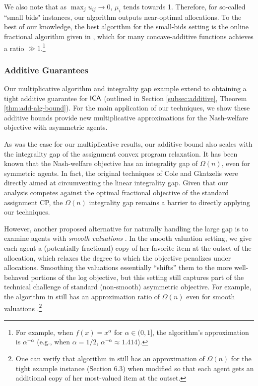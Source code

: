 We also note that as $\max_{j}u_{ij} \rightarrow 0$, $\mu_i$ tends towards 1. Therefore, for so-called ``small bids" instances, our algorithm outputs near-optimal allocations. To the best of our knowledge, the best algorithm for the small-bids setting is  the online fractional algorithm given in \cite{devanur2012online}, which
for many concave-additive functions achieves a ratio $\gg 1$.\footnote{For example, when $f(x) = x^\alpha$ for $\alpha \in (0,1]$, the algorithm's approximation is $\alpha^{-\alpha}$ (e.g., when $\alpha = 1/2$, $ \alpha^{-\alpha} \approx 1.414$).}


\subsubsection{Additive Guarantees}
\label{subsub:add-guar}


Our multiplicative algorithm and integrality gap example extend to obtaining a tight additive guarantee for $\mathsf{ICA}$ (outlined in Section 
\ref{subsec:additive}, Theorem \ref{thm:add-alg-bound}).
For the main application of our techniques, we show these additive bounds provide new multiplicative approximations for the Nash-welfare objective with asymmetric agents.

As was the case for our multiplicative results,  our additive bound also scales with the integrality gap of the assignment convex program relaxation. 
It has been known that the Nash-welfare objective has an integrality gap of $\Omega(n)$, even for symmetric agents. In fact, the original techniques of Cole and Gkatzelis \cite{cole2015approximating} were directly aimed at circumventing the linear integrality gap. Given that our analysis competes against the optimal fractional objective of the standard assignment CP, the $\Omega(n)$ integrality gap remains a barrier to directly applying our techniques. 


However, another proposed alternative for naturally handling the large gap is to examine agents with {\em smooth valuations} \cite{fain2018fair, fluschnik2019fair}.
In the smooth valuation setting, we give each agent a (potentially fractional) copy of her favorite item at the outset of the allocation, which relaxes the degree to which the objective penalizes under allocations.
Smoothing the valuations essentially ``shifts'' them to the more well-behaved portions of the log objective, but this setting still captures part of the technical challenge of standard (non-smooth) asymmetric objective. 
For example, the algorithm in \cite{garg2020approximating} still has an approximation ratio of $\Omega(n)$ even for smooth valuations \cite{garg2020approximating}.\footnote{One can verify that algorithm in  \cite{garg2020approximating} still has an approximation of $\Omega(n)$ for the tight example instance (Section 6.3) when modified so that each agent gets an additional copy of her most-valued item at the outset.}


